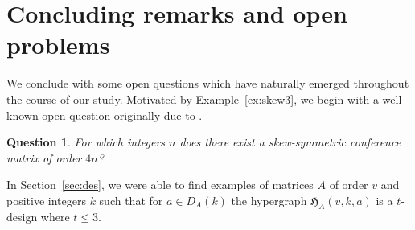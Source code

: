 \documentclass[11pt]{article}
\makeatletter
\newcommand*{\transpose}{%
  {\mathpalette\@transpose{}}%
}
\newcommand*{\@transpose}[2]{%
  \raisebox{\depth}{$\m@th#1\intercal$}%
}
\newtheorem{question}[theorem]{Question}
\makeatother
\begin{document}





\section{Concluding remarks and open problems}
\label{sec:open}
We conclude with some open questions which have naturally emerged throughout the course of our study.
Motivated by Example~\ref{ex:skew3}, we begin with a well-known open question originally due to \cite{S78}. 

\begin{question}
For which integers $n$ does there exist a skew-symmetric conference matrix of order $4n$? 
\end{question}

In Section~\ref{sec:des}, we were able to find examples of matrices $A$ of order $v$ and positive integers $k$ such that for $a \in D_A(k)$ the hypergraph $\mathfrak H_A(v,k,a)$ is a $t$-design where $t \leqslant 3$.
\end{document}
